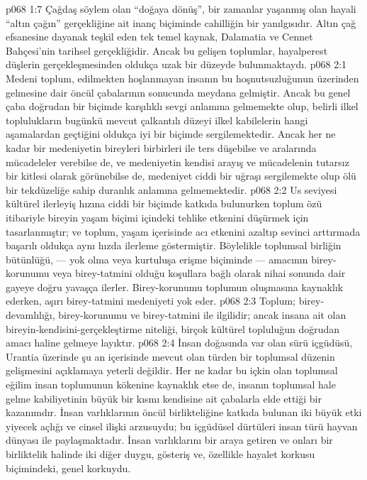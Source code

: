 \vs p068 1:7 Çağdaş söylem olan “doğaya dönüş”, bir zamanlar yaşanmış olan hayali “altın çağın” gerçekliğine ait inanç biçiminde cahilliğin bir yanılgısıdır. Altın çağ efsanesine dayanak teşkil eden tek temel kaynak, Dalamatia ve Cennet Bahçesi’nin tarihsel gerçekliğidir. Ancak bu gelişen toplumlar, hayalperest düşlerin gerçekleşmesinden oldukça uzak bir düzeyde bulunmaktaydı.
\vs p068 2:1 Medeni toplum,  edilmekten hoşlanmayan insanın bu hoşnutsuzluğunun üzerinden gelmesine dair öncül çabalarının sonucunda meydana gelmiştir. Ancak bu genel çaba doğrudan bir biçimde karşılıklı sevgi anlamına gelmemekte olup, belirli ilkel toplulukların bugünkü mevcut çalkantılı düzeyi ilkel kabilelerin hangi aşamalardan geçtiğini oldukça iyi bir biçimde sergilemektedir. Ancak her ne kadar bir medeniyetin bireyleri birbirleri ile ters düşebilse ve aralarında mücadeleler verebilse de, ve medeniyetin kendisi arayış ve mücadelenin tutarsız bir kitlesi olarak görünebilse de, medeniyet ciddi bir uğraşı sergilemekte olup ölü bir tekdüzeliğe sahip duranlık anlamına gelmemektedir.
\vs p068 2:2 Us seviyesi kültürel ilerleyiş hızına ciddi bir biçimde katkıda bulunurken toplum özü itibariyle bireyin yaşam biçimi içindeki tehlike etkenini düşürmek için tasarlanmıştır; ve toplum, yaşam içerisinde acı etkenini azaltıp sevinci arttırmada başarılı oldukça aynı hızda ilerleme göstermiştir. Böylelikle toplumsal birliğin bütünlüğü, --- yok olma veya kurtuluşa erişme biçiminde --- amacının birey\hyp{}korunumu veya birey\hyp{}tatmini olduğu koşullara bağlı olarak nihai sonunda dair gayeye doğru yavaşça ilerler. Birey\hyp{}korunumu toplumun oluşmasına kaynaklık ederken, aşırı birey\hyp{}tatmini medeniyeti yok eder.
\vs p068 2:3 Toplum; birey\hyp{}devamlılığı, birey\hyp{}korunumu ve birey\hyp{}tatmini ile ilgilidir; ancak insana ait olan bireyin\hyp{}kendisini\hyp{}gerçekleştirme niteliği, birçok kültürel topluluğun doğrudan amacı haline gelmeye layıktır.
\vs p068 2:4 İnsan doğasında var olan sürü içgüdüsü, Urantia üzerinde şu an içerisinde mevcut olan türden bir toplumsal düzenin gelişmesini açıklamaya yeterli değildir. Her ne kadar bu içkin olan toplumsal eğilim insan toplumunun kökenine kaynaklık etse de, insanın toplumsal hale gelme kabiliyetinin büyük bir kısmı kendisine ait çabalarla elde ettiği bir kazanımdır. İnsan varlıklarının öncül birlikteliğine katkıda bulunan iki büyük etki yiyecek açlığı ve cinsel ilişki arzusuydu; bu içgüdüsel dürtüleri insan türü hayvan dünyası ile paylaşmaktadır. İnsan varlıklarını bir araya getiren ve onları bir birliktelik halinde  iki diğer duygu, gösteriş ve, özellikle hayalet korkusu biçimindeki, genel korkuydu.
